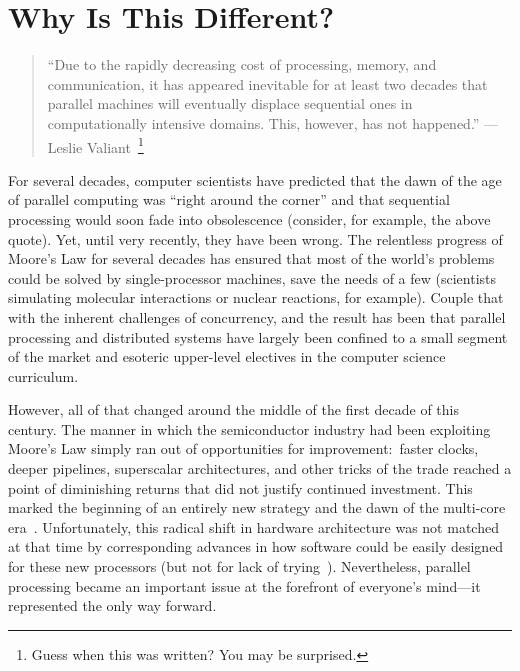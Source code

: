 
\section{Why Is This Different?}

\begin{quote}
``Due to the rapidly decreasing cost of processing, memory, and
  communication, it has appeared inevitable for at least two decades
  that parallel machines will eventually displace sequential ones in
  computationally intensive domains.  This, however, has not
  happened.'' --- Leslie
  Valiant~\cite{Valiant_CACM1990}\footnote{Guess when this was
    written?  You may be surprised.}
\end{quote}

\noindent For several decades, computer scientists have predicted that the dawn
of the age of parallel computing was ``right around the corner'' and
that sequential processing would soon fade into obsolescence
(consider, for example, the above quote).  Yet, until very recently,
they have been wrong.  The relentless progress of Moore's Law for
several decades has ensured that most of the world's problems could be
solved by single-processor machines, save the needs of a few
(scientists simulating molecular interactions or nuclear reactions,
for example).  Couple that with the inherent challenges of
concurrency, and the result has been that parallel processing and
distributed systems have largely been confined to a small segment of
the market and esoteric upper-level electives in the computer science
curriculum.

However, all of that changed around the middle of the first decade of
this century.  The manner in which the semiconductor industry had been
exploiting Moore's Law simply ran out of opportunities for
improvement:\ faster clocks, deeper pipelines, superscalar
architectures, and other tricks of the trade reached a point of
diminishing returns that did not justify continued investment.  This
marked the beginning of an entirely new strategy and the dawn of the
multi-core era~\cite{Olukotun_Hammond_2005}.  Unfortunately, this
radical shift in hardware architecture was not matched at that time by
corresponding advances in how software could be easily designed for
these new processors (but not for lack of trying~\cite{McCool_2008}).
Nevertheless, parallel processing became an important issue at the
forefront of everyone's mind---it represented the only way forward.


